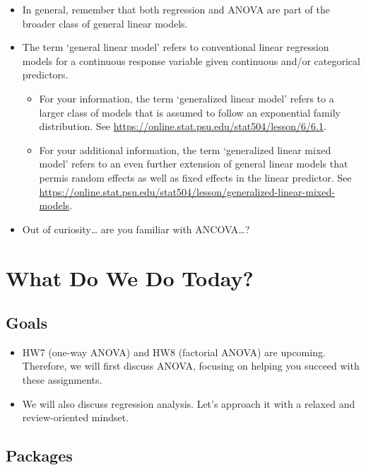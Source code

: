 \documentclass[
]{book}
\begin{document}
\begin{itemize}
\item
  In general, remember that both regression and ANOVA are part of the broader class of general linear models.
\item
  The term `general linear model' refers to conventional linear regression models for a continuous response variable given continuous and/or categorical predictors.

  \begin{itemize}
  \item
    For your information, the term `generalized linear model' refers to a larger class of models that is assumed to follow an exponential family distribution. See \url{https://online.stat.psu.edu/stat504/lesson/6/6.1}.
  \item
    For your additional information, the term `generalized linear mixed model' refers to an even further extension of general linear models that permis random effects as well as fixed effects in the linear predictor. See \url{https://online.stat.psu.edu/stat504/lesson/generalized-linear-mixed-models}.
  \end{itemize}
\item
  Out of curiosity\ldots{} are you familiar with ANCOVA\ldots?
\end{itemize}

\section{What Do We Do Today?}\label{what-do-we-do-today}

\subsection{Goals}\label{goals}

\begin{itemize}
\item
  HW7 (one-way ANOVA) and HW8 (factorial ANOVA) are upcoming. Therefore, we will first discuss ANOVA, focusing on helping you succeed with these assignments.
\item
  We will also discuss regression analysis. Let's approach it with a relaxed and review-oriented mindset.
\end{itemize}

\subsection{Packages}\label{packages-2}
\end{document}
